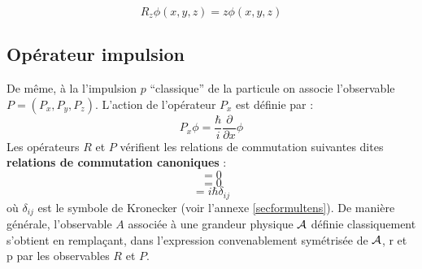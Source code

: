 \documentclass[12pt]{book}
\begin{document}
\begin{equation}
R_z\phi(x,y,z)=z\phi(x,y,z)
\end{equation}

\subsection{Op\'erateur impulsion}
De m\^eme, \`a la l'impulsion $p$ ``classique'' de la particule on
associe l'observable $P=(P_x,P_y,P_z)$. L'action de l'op\'erateur
$P_x$ est d\'efinie par :
\begin{equation}
P_x\phi=\frac{\hbar}{i}\frac{\partial}{\partial x} \phi
\end{equation}
Les op\'erateurs 
$R$ et $P$ v\'erifient les relations de commutation suivantes dites
{\bf relations de commutation canoniques} :
\begin{equation}
[R_i,R_j]=0
\end{equation}
\begin{equation}
[P_i,P_j]=0
\end{equation}
\begin{equation}
[R_i,P_j]=i\hbar \delta_{ij}
\end{equation}
o\`u $\delta_{ij}$ est le symbole de Kronecker (voir l'annexe
\ref{secformultens}).
De mani\`ere g\'en\'erale, l'observable $A$ associ\'ee \`a une
grandeur physique $\cal A$ d\'efinie classiquement s'obtient en
rempla\c cant, dans l'expression convenablement sym\'etris\'ee de
$\cal A$, r et p par les observables $R$ et $P$.
\end{document}
